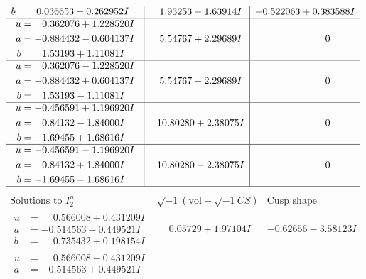 \documentclass[1p]{elsarticle_modified}
\theoremstyle{definition}
\newcommand{\I}{\sqrt{-1}}
\begin{document}
$$\begin{array}{c|c|c}
\begin{aligned}
b &= \phantom{-}0.036653 - 0.262952 I\end{aligned}
 & \phantom{-}1.93253 - 1.63914 I & -0.522063 + 0.383588 I \\ \hline\begin{aligned}
u &= \phantom{-}0.362076 + 1.228520 I \\
a &= -0.884432 - 0.604137 I \\
b &= \phantom{-}1.53193 + 1.11081 I\end{aligned}
 & \phantom{-}5.54767 + 2.29689 I & \phantom{-0.000000 } 0 \\ \hline\begin{aligned}
u &= \phantom{-}0.362076 - 1.228520 I \\
a &= -0.884432 + 0.604137 I \\
b &= \phantom{-}1.53193 - 1.11081 I\end{aligned}
 & \phantom{-}5.54767 - 2.29689 I & \phantom{-0.000000 } 0 \\ \hline\begin{aligned}
u &= -0.456591 + 1.196920 I \\
a &= \phantom{-}0.84132 - 1.84000 I \\
b &= -1.69455 + 1.68616 I\end{aligned}
 & \phantom{-}10.80280 + 2.38075 I & \phantom{-0.000000 } 0 \\ \hline\begin{aligned}
u &= -0.456591 - 1.196920 I \\
a &= \phantom{-}0.84132 + 1.84000 I \\
b &= -1.69455 - 1.68616 I\end{aligned}
 & \phantom{-}10.80280 - 2.38075 I & \phantom{-0.000000 } 0\\
 \hline 
 \end{array}$$\newpage$$\begin{array}{c|c|c}  
\text{Solutions to }I^u_{2}& \I (\text{vol} + \sqrt{-1}CS) & \text{Cusp shape}\\
 \hline 
\begin{aligned}
u &= \phantom{-}0.566008 + 0.431209 I \\
a &= -0.514563 - 0.449521 I \\
b &= \phantom{-}0.735432 + 0.198154 I\end{aligned}
 & \phantom{-}0.05729 + 1.97104 I & -0.62656 - 3.58123 I \\ \hline\begin{aligned}
u &= \phantom{-}0.566008 - 0.431209 I \\
a &= -0.514563 + 0.449521 I \\

\end{aligned}
\end{array}$$
\end{document}
